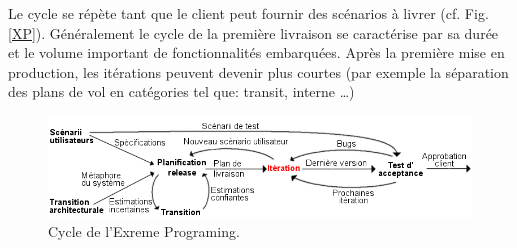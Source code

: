 Le cycle se répète tant que le client peut fournir des scénarios à livrer (cf. Fig. \vref{XP}). Généralement le cycle de la première livraison se caractérise par sa durée et le volume important de fonctionnalités embarquées. Après la première mise en production, les itérations peuvent devenir plus courtes (par exemple la séparation des plans de vol en catégories tel que: transit, interne …)
\begin{figure}
\center
\includegraphics[width=15cm]{images/xp.png}
\caption{Cycle de l'Exreme Programing.}
\label{XP}
\end{figure}
